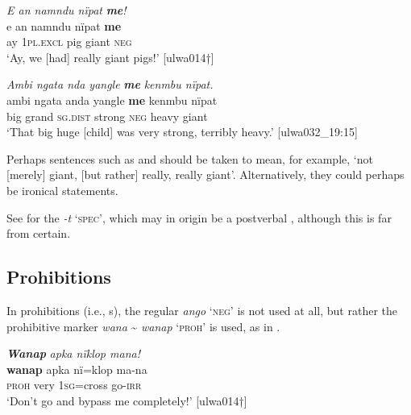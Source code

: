 \ea%
    \label{ex:syntax:165}
          \textit{E an namndu nïpat} \textbf{\textit{me}}\textit{!}\\
\gll    e  an      namndu  nïpat  \textbf{me}\\
    ay  1\textsc{pl.excl}  pig      giant  \textsc{neg}\\
\glt `Ay, we [had] really giant pigs!’ [ulwa014†]
\z

\ea%
    \label{ex:syntax:166}
          \textit{Ambi ngata nda yangle} \textbf{\textit{me}} \textit{kenmbu nïpat.}\\
\gll    ambi  ngata  anda    yangle  \textbf{me}    kenmbu  nïpat\\
    big    grand  \textsc{sg.dist}  strong  \textsc{neg}  heavy    giant\\
\glt `That big huge [child] was very strong, terribly heavy.’ [ulwa032\_19:15]
\z


Perhaps sentences such as  and  should be taken to mean, for example, ‘not [merely] giant, [but rather] really, really giant’. Alternatively, they could perhaps be  ironical statements.

  See  for the   \textit{-t} ‘\textsc{spec}’, which may in origin be a postverbal , although this is far from certain.



\subsection{Prohibitions}\label{sec:13.3.3}


In prohibitions (i.e.,  s), the regular  \textit{ango} ‘\textsc{neg’} is not used at all, but rather the prohibitive marker \textit{wana} {\textasciitilde} \textit{wanap} ‘\textsc{proh’} is used, as in .

\ea%
    \label{ex:syntax:167}
          \textbf{\textit{Wanap}} \textit{apka nïklop mana!}\\
\gll    \textbf{wanap}  apka  nï=klop  ma-na\\
    \textsc{proh}  very  1\textsc{sg}=cross  go-\textsc{irr}\\
\glt `Don’t go and bypass me completely!’ [ulwa014†]
\z

